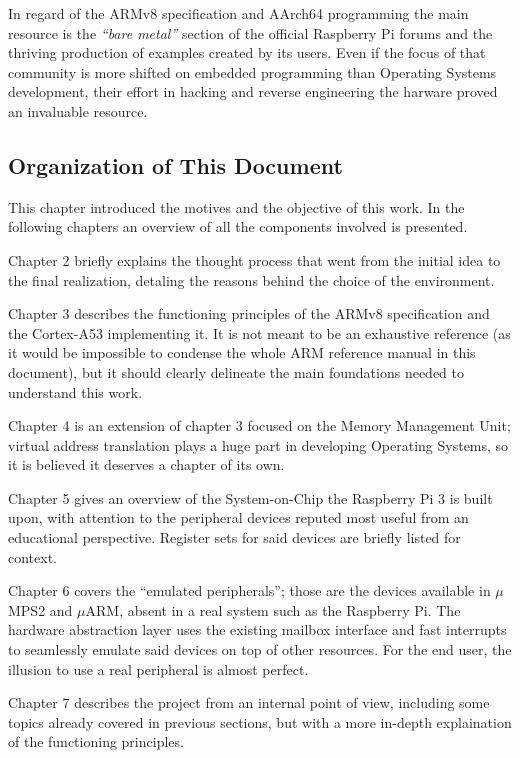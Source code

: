 \documentclass[12pt,a4paper,openright,twoside]{report}
\begin{document}
In regard of the ARMv8 specification and AArch64 programming the main resource
is the \textit{``bare metal''} section of the official Raspberry Pi forums and the thriving
production of examples created by its users. Even if the focus of that community
is more shifted on embedded programming than Operating Systems development, their
effort in hacking and reverse engineering the harware proved an invaluable resource.

\subsection{Organization of This Document}
This chapter introduced the motives and the objective of this work. In the following
chapters an overview of all the components involved is presented.

Chapter 2 briefly explains the thought process that went from the initial idea
to the final realization, detaling the reasons behind the choice of the environment.

Chapter 3 describes the functioning principles of the ARMv8 specification and
 the Cortex-A53 implementing it. It is not meant to be an exhaustive reference 
 (as it would be impossible to condense the whole ARM reference manual in this
 document), but it should clearly delineate the main foundations needed to 
 understand this work.

Chapter 4 is an extension of chapter 3 focused on the Memory Management Unit; 
virtual address translation plays a huge part in developing
Operating Systems, so it is believed it deserves a chapter of its own.

Chapter 5 gives an overview of the System-on-Chip the Raspberry Pi 3 is built
upon, with attention to the peripheral devices reputed most useful from an 
educational perspective. Register sets for said devices are briefly listed for 
context.

Chapter 6 covers the ``emulated peripherals''; those are the devices available in 
$\mu$MPS2 and $\mu$ARM, absent in a real system such as the Raspberry Pi. The hardware
abstraction layer uses the existing mailbox interface and fast interrupts
 to seamlessly emulate said
devices on top of other resources. For the end user, the illusion to use a real
peripheral is almost perfect.

Chapter 7 describes the project from an internal point of view, including some
topics already covered in previous sections, but with a more in-depth explaination
of the functioning principles.
\end{document}
